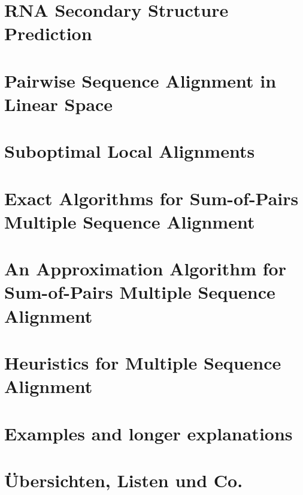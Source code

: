 \chapter{RNA Secondary Structure Prediction}\label{ch:rna-secondary-structure-prediction}


\chapter{Pairwise Sequence Alignment in Linear Space}\label{ch:pairwise-sequence-alignment-in-linear-space}


\chapter{Suboptimal Local Alignments}\label{ch:suboptimal-local-alignments}


\chapter{Exact Algorithms for Sum-of-Pairs Multiple Sequence Alignment}\label{ch:exact-algorithms-for-sum-of-pairs-multiple-sequence-alignment}


\chapter{An Approximation Algorithm for Sum-of-Pairs Multiple Sequence Alignment}\label{ch:an-approximation-algorithm-for-sum-of-pairs-multiple-sequence-alignment}


\chapter{Heuristics for Multiple Sequence Alignment}\label{ch:heuristics-for-multiple-sequence-alignment}


\chapter{Examples and longer explanations}\label{ch:examples-and-longer-explanations}

\newpage

\newpage

\newpage

\newpage

\newpage



\newpage
\chapter{Übersichten, Listen und Co.}
